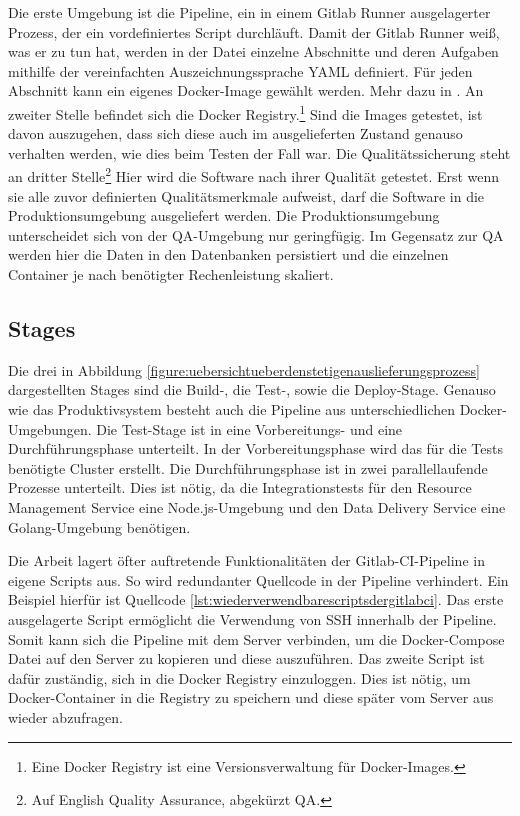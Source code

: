 Die erste Umgebung ist die Pipeline, ein in einem
Gitlab Runner ausgelagerter Prozess, der ein vordefiniertes Script durchläuft.
Damit der Gitlab Runner weiß, was er zu tun hat, werden in der 
Datei einzelne Abschnitte und deren Aufgaben mithilfe der vereinfachten
Auszeichnungssprache YAML definiert. Für jeden Abschnitt kann ein eigenes Docker-Image
gewählt werden. Mehr dazu in . An zweiter Stelle
befindet sich die Docker Registry.\footnote{Eine Docker Registry ist eine Versionsverwaltung für Docker-Images.}
Sind die Images getestet, ist davon auszugehen, dass sich diese auch
im ausgelieferten Zustand genauso verhalten werden, wie dies beim Testen
der Fall war. Die Qualitätssicherung steht an dritter Stelle\footnote{Auf English Quality Assurance, abgekürzt QA.}
Hier wird die Software nach ihrer Qualität getestet. Erst wenn sie alle
zuvor definierten Qualitätsmerkmale aufweist, darf die Software in die Produktionsumgebung
ausgeliefert werden. Die Produktionsumgebung unterscheidet sich von der QA-Umgebung
nur geringfügig. Im Gegensatz zur QA werden hier die Daten in den Datenbanken persistiert und die
einzelnen Container je nach benötigter Rechenleistung skaliert.

\subsection{Stages}
\label{subsec:stages}
Die drei in Abbildung \ref{figure:uebersichtueberdenstetigenauslieferungsprozess} dargestellten Stages sind
die \mbox{Build-,} die \mbox{Test-,} sowie die Deploy-Stage. Genauso wie das Produktivsystem
besteht auch die Pipeline aus unterschiedlichen Docker-Umgebungen. Die Test-Stage ist in eine Vorbereitungs-
und eine Durchführungsphase unterteilt. In der Vorbereitungsphase wird das für die Tests
benötigte Cluster erstellt. Die Durchführungsphase ist in zwei parallellaufende Prozesse
unterteilt. Dies ist nötig, da die Integrationstests für den Resource Management Service
eine Node.js-Umgebung und den Data Delivery Service eine Golang-Umgebung benötigen.

Die Arbeit lagert öfter auftretende Funktionalitäten der Gitlab-CI-Pipeline in eigene Scripts aus.
So wird redundanter Quellcode in der Pipeline verhindert. Ein Beispiel hierfür
ist Quellcode \ref{lst:wiederverwendbarescriptsdergitlabci}. Das erste ausgelagerte
Script ermöglicht die Verwendung von SSH innerhalb der Pipeline. Somit kann sich
die Pipeline mit dem Server verbinden, um die Docker-Compose Datei auf den Server
zu kopieren und diese auszuführen. Das zweite Script ist dafür zuständig,
sich in die Docker Registry einzuloggen. Dies ist nötig, um Docker-Container
in die Registry zu speichern und diese später vom Server aus wieder abzufragen.

